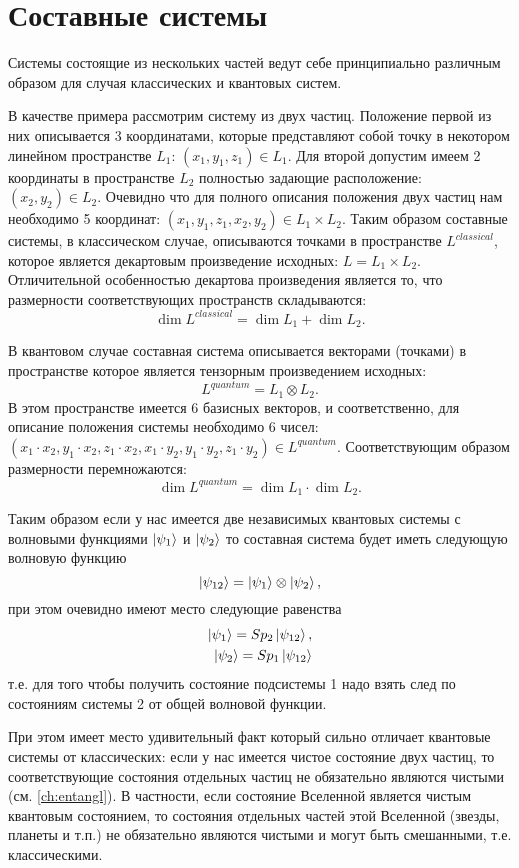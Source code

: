 \section{Составные системы}
\label{sec:add:quantum:composite}
Системы состоящие из нескольких частей ведут себе принципиально
различным образом для случая классических и квантовых систем.


В качестве примера рассмотрим систему из двух частиц. Положение первой
из них описывается 3 координатами, которые представляют собой точку в
некотором линейном пространстве $L_1$: $(x_1, y_1, z_1) \in L_1$. Для второй
допустим имеем 2 координаты в пространстве $L_2$ полностью задающие
расположение:  
$(x_2, y_2) \in L_2$. Очевидно что для полного описания положения двух
частиц нам необходимо 5 координат: $(x_1, y_1, z_1, x_2, y_2) \in L_1
\times L_2$. Таким образом составные системы, в классическом случае,
описываются точками в пространстве $L^{classical}$, которое является декартовым
произведение исходных: $L = L_1 \times L_2$. Отличительной
особенностью декартова произведения является то, что размерности
соответствующих пространств складываются:
\[
\dim{L^{classical}} = \dim{L_1} + \dim{L_2}.
\] 

В квантовом случае составная система описывается векторами (точками) в
пространстве которое является тензорным произведением исходных: 
\[
L^{quantum} = L_1 \otimes L_2.
\]
В этом пространстве имеется 6 базисных векторов, и соответственно, для
описание положения системы необходимо 6 чисел:
$(x_1 \cdot x_2, y_1 \cdot x_2, z_1 \cdot x_2, 
x_1 \cdot y_2, y_1 \cdot y_2, z_1 \cdot y_2) \in L^{quantum}$. 
Соответствующим образом размерности перемножаются:
\[
\dim{L^{quantum}} = \dim{L_1} \cdot \dim{L_2}.
\] 

Таким образом если у нас имеется две независимых квантовых системы с
волновыми функциями $\ket{\psi_1}$ и $\ket{\psi_2}$ то составная
система будет иметь следующую волновую функцию
\[
\ket{\psi_{12}} = \ket{\psi_1} \otimes \ket{\psi_2},
\]
при этом очевидно имеют место следующие равенства 
\begin{eqnarray}
\ket{\psi_1} = Sp_2 \ket{\psi_{12}}, \\
\nonumber
\ket{\psi_2} = Sp_1 \ket{\psi_{12}} 
\nonumber
\end{eqnarray}
т.е. для того чтобы получить состояние подсистемы 1 надо взять след по
состояниям системы 2 от общей волновой функции. 

При этом имеет место удивительный факт который сильно отличает
квантовые системы от классических: если у нас имеется чистое состояние
двух частиц, то соответствующие состояния отдельных частиц не
обязательно являются чистыми (см. \autoref{ch:entangl}). В частности,
если состояние Вселенной является чистым квантовым состоянием, то
состояния отдельных частей этой Вселенной (звезды, планеты и т.п.) не
обязательно являются чистыми и могут быть смешанными, т.е.
классическими. 
